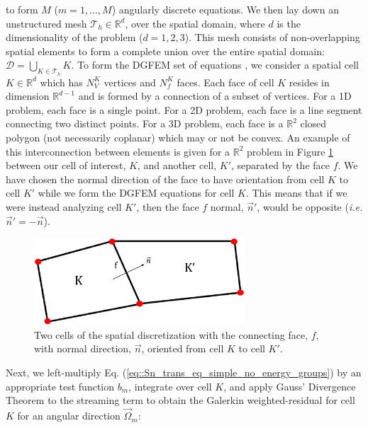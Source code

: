 \noindent to form $M$ ($m=1,...,M$) angularly discrete equations. We then lay down an unstructured mesh $\mathcal{T}_h \in \mathbb{R}^{d}$, over the spatial domain, where $d$ is the dimensionality of the problem ($d=1,2,3$). This mesh consists of non-overlapping spatial elements to form a complete union over the entire spatial domain: $\mathcal{D} = \bigcup_{K \in \mathcal{T}_h} K$. To form the DGFEM set of equations \cite{ern2013theory,wareing2001discontinuous}, we consider a spatial cell $K \in \mathbb{R}^d$ which has $N_V^K$ vertices and $N_f^K$ faces. Each face of cell $K$ resides in dimension $\mathbb{R}^{d-1}$ and is formed by a connection of a subset of vertices. For a 1D problem, each face is a single point. For a 2D problem, each face is a line segment connecting two distinct points. For a 3D problem, each face is a $\mathbb{R}^2$ closed polygon (not necessarily coplanar) which may or not be convex. An example of this interconnection between elements is given for a $\mathbb{R}^2$ problem in Figure \ref{fig::Sn_two_ref_cells} between our cell of interest, $K$, and another cell, $K'$, separated by the face $f$. We have chosen the normal direction of the face to have orientation from cell $K$ to cell $K'$ while we form the DGFEM equations for cell $K$. This means that if we were instead analyzing cell $K'$, then the face $f$ normal, $\vec{n}' $, would be opposite ({\em i.e.} $\vec{n}' = -\vec{n}$).

\begin{figure}
\centering
\includegraphics[width=0.7\textwidth]{figures/sec_Sn/two_cells_Rev1.eps}
\caption[Two cells of the spatial discretization]{Two cells of the spatial discretization with the connecting face, $f$, with normal direction, $\vec{n}$, oriented from cell $K$ to cell $K'$.}
\label{fig::Sn_two_ref_cells}
\end{figure}

Next, we left-multiply Eq. (\ref{eq::Sn_trans_eq_simple_no_energy_groups}) by an appropriate test function $b_m$, integrate over cell $K$, and apply Gauss' Divergence Theorem to the streaming term to obtain the Galerkin weighted-residual for cell $K$ for an angular direction $\vec{\Omega}_m$:

